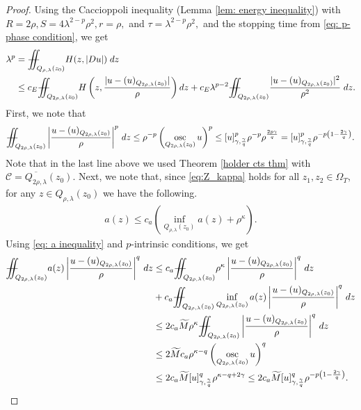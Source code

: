 \documentclass[notitlepage,11pt,reqno]{amsart}
\theoremstyle{definition}
\numberwithin{equation}{section}
\DeclareMathOperator*{\osc}{osc}
\newcommand{\iintss}{{\int\hspace{-0.28cm}\int}}
\newcommand{ \miints }{{\iintss\hspace{-0.56cm} -\hspace{-0.15cm}-}}
\newcommand{\miint}[1]{{\miints_{\hspace{-0.13cm}#1}}}
\begin{document}
\begin{proof}
 Using the Caccioppoli inequality (Lemma \ref{lem: energy inequality}) with $R=2\rho, S=4\lambda^{2-p}\rho^2, r=\rho,$ and $\tau=\lambda^{2-p}\rho^2,$ and the stopping time from \eqref{eq: p-phase condition}, we get
 \begin{align*}
     \lambda^p&=\miint{Q_{\rho,\lambda}(z_0)} H(z,|Du|) \; dz\\
     &\leq c_E\miint{Q_{2\rho, \lambda}(z_0)}   H\left(z,\frac{|u-(u)_{Q_{2\rho, \lambda}(z_0)}|}{\rho}\right) dz+c_E\lambda^{p-2}\miint{Q_{2\rho, \lambda}(z_0)}\frac{|u-(u)_{Q_{2\rho,\lambda}(z_0)}|^2}{\rho^2}\;dz.
 \end{align*}
 First, we note that
 \begin{align*}
     \miint{Q_{2\rho, \lambda}(z_0)}\left|\frac{u-(u)_{Q_{2\rho, \lambda}(z_0)}}{\rho}\right|^p\, dz\leq \rho^{-p}\left(\osc_{Q_{2\rho, \lambda}(z_0)} u\right)^{p}\leq [u]^p_{\gamma, \frac{\gamma}{q}}\rho^{-p}\rho^{\frac{2p\gamma}{q}}=[u]^p_{\gamma, \frac{\gamma}{q}}\rho^{-p\left(1-\frac{2\gamma}{q}\right)}.
 \end{align*}
 Note that in the last line above we used Theorem \ref{holder cts thm} with $\mathcal{C}=\overline{Q_{2\rho, \lambda}}(z_0).$
 Next, we note that, since \eqref{eq:Z_kappa} holds for all $z_1, z_2 \in \Omega_T,$ for any $z\in Q_{\rho, \lambda}(z_0)$ we have the following.
 \begin{align}\label{eq: a inequality}
     a(z) \leq c_a \left(\inf_{Q_{\rho, \lambda}(z_0)}a(z)+\rho^{\kappa}\right).
 \end{align}
 Using \eqref{eq: a inequality} and $p$-intrinsic conditions, we get
 \begin{align*}
 \miint{Q_{2\rho, \lambda}(z_0)}a(z)\left|\frac{u-(u)_{Q_{2\rho, \lambda}(z_0)}}{\rho}\right|^q\, dz &\leq c_a\miint{Q_{2\rho, \lambda}(z_0)}\rho^{\kappa}\left|\frac{u-(u)_{Q_{2\rho, \lambda}(z_0)}}{\rho}\right|^q\, dz \\
& +c_a\miint{Q_{2\rho, \lambda}(z_0)}\inf_{Q_{2\rho, \lambda}(z_0)}a(z)\left|\frac{u-(u)_{Q_{2\rho, \lambda}(z_0)}}{\rho}\right|^q\, dz\\
&\leq 2c_a \widetilde M \rho^{\kappa}\miint{Q_{2\rho, \lambda}(z_0)}\left|\frac{u-(u)_{Q_{2\rho, \lambda}(z_0)}}{\rho}\right|^q\, dz\\
&\leq 2\widetilde M c_a\rho^{\kappa-q}\left(\osc_{Q_{2\rho, \lambda}(z_0)} u\right)^q \\
&\leq 2c_a\widetilde M[u]^q_{\gamma, \frac{\gamma}{q}} \rho^{\kappa-q+2\gamma}\leq 2c_a \widetilde M [u]^q_{\gamma, \frac{\gamma}{q}} \rho^{-p\left(1-\frac{2\gamma}{q}\right)}.

\end{align*}
\end{proof}
\end{document}
